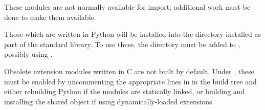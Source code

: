 These modules are not normally available for import; additional work
must be done to make them available.

Those which are written in Python will be installed into the directory 
 installed as part of the standard library.  To use
these, the directory must be added to , possibly using
.

Obsolete extension modules written in C are not built by default.
Under \UNIX, these must be enabled by uncommenting the appropriate
lines in  in the build tree and either rebuilding
Python if the modules are statically linked, or building and
installing the shared object if using dynamically-loaded extensions.


